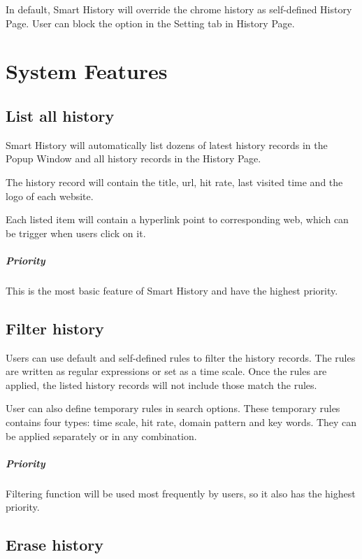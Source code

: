 \documentclass[a5paper]{scrreprt}
\begin{document}
In default, Smart History will override the chrome history as self-defined 
History Page. User can block the option in the Setting tab in History Page.


\chapter{System Features}

\section{List all history}

Smart History will automatically list dozens of latest history records in the 
Popup Window and all history records in the History Page.

The history record will contain the title, url, hit rate, last visited time 
and the logo of each website.

Each listed item will contain a hyperlink point to corresponding web, which 
can be trigger when users click on it.

\paragraph{Priority} This is the most basic feature of Smart History and have the 
highest priority.

\section{Filter history}

Users can use default and self-defined rules to filter the history records. The 
rules are written as regular expressions or set as a time scale. Once the rules 
are applied, the listed history records will not include those match the rules.

User can also define temporary rules in search options. These temporary rules 
contains four types: time scale, hit rate, domain pattern and key words. They 
can be applied separately or in any combination.

\paragraph{Priority} Filtering function will be used most frequently by users, 
so it also has the highest priority.

\section{Erase history}
\end{document}
